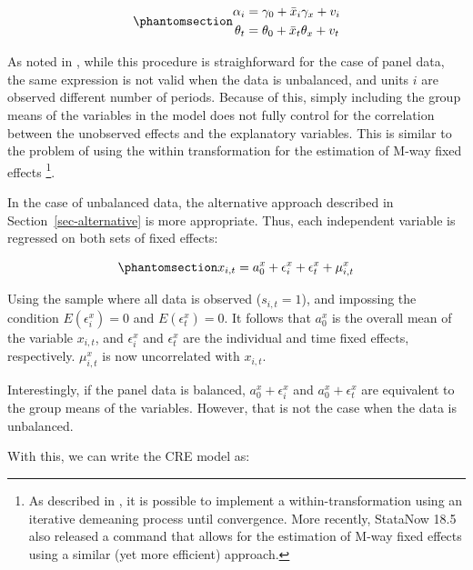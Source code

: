 \documentclass[bib]{statapress}
\begin{document}
\begin{equation}\phantomsection\label{eq-mcre-md}{\begin{aligned}
\alpha_i &= \gamma_0 + \bar x_{i}\gamma_x  + v_i \\
\theta_t &= \theta_0 + \bar x_{t}\theta_x  + v_t
\end{aligned}
}\end{equation}

As noted in \citet{wooldridge2019}, while this procedure is
straighforward for the case of panel data, the same expression is not
valid when the data is unbalanced, and units \(i\) are observed
different number of periods. Because of this, simply including the group
means of the variables in the model does not fully control for the
correlation between the unobserved effects and the explanatory
variables. This is similar to the problem of using the within
transformation for the estimation of M-way fixed effects
\citep[\texttt{areg}]{rios2015, correia_2016, stata19}\footnote{As
  described in \citet{rios2015}, it is possible to implement a
  within-transformation using an iterative demeaning process until
  convergence. More recently, StataNow 18.5 also released a command that
  allows for the estimation of M-way fixed effects using a similar (yet
  more efficient) approach.}.

In the case of unbalanced data, the alternative approach described in
Section~\ref{sec-alternative} is more appropriate. Thus, each
independent variable is regressed on both sets of fixed effects:

\begin{equation}\phantomsection\label{eq-mcre-analogy}{
x_{i,t} = a^x_0 + \epsilon^x_i  +\epsilon^x_t+ \mu^x_{i,t}
}\end{equation}

Using the sample where all data is observed (\(s_{i,t} = 1\)), and
impossing the condition \(E(\epsilon^x_i) = 0\) and
\(E(\epsilon^x_t) = 0\). It follows that \(a^x_0\) is the overall mean
of the variable \(x_{i,t}\), and \(\epsilon^x_i\) and \(\epsilon^x_t\)
are the individual and time fixed effects, respectively. \(\mu^x_{i,t}\)
is now uncorrelated with \(x_{i,t}\).

Interestingly, if the panel data is balanced, \(a^x_0 + \epsilon^x_i\)
and \(a^x_0 + \epsilon^x_t\) are equivalent to the group means of the
variables. However, that is not the case when the data is unbalanced.

With this, we can write the CRE model as:
\end{document}
